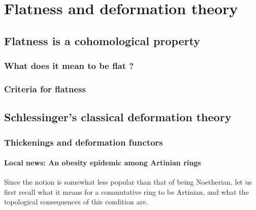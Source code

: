 \chapter{Flatness and deformation theory}
    \begin{abstract}
        
    \end{abstract}
    
    \minitoc
    
    \section{Flatness is a cohomological property}
        \subsection{What does it mean to be flat ?}
        
        \subsection{Criteria for flatness}

    \section{Schlessinger's classical deformation theory}
        \subsection{Thickenings and deformation functors}
            \subsubsection{Local news: An obesity epidemic among Artinian rings}
                Since the notion is somewhat less popular than that of being Noetherian, let us first recall what it means for a commutative ring to be Artinian, and what the topological consequences of this condition are.
                
